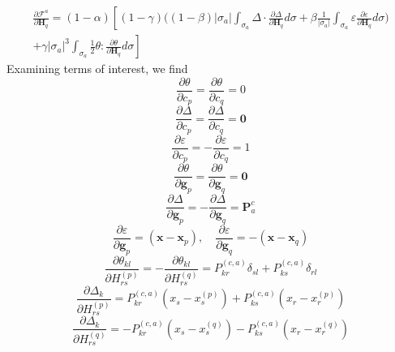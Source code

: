 \documentclass[11pt]{article} %
\begin{document}
\begin{eqnarray}
	\frac{\partial \mathcal{F}^a}{\partial \mathbf{H}_q} = (1-\alpha) \left[ (1-\gamma) \bigg( (1-\beta) | \sigma_a | \int_{\sigma_a} \Delta \cdot \frac{\partial \Delta}{\partial \mathbf{H}_q} d \sigma + \beta \frac{1}{| \sigma_a |} \int_{\sigma_a} \varepsilon \frac{\partial \varepsilon}{\partial \mathbf{H}_q} d \sigma \bigg) \right. \nonumber \\ \left. + \gamma | \sigma_a |^3 \int_{\sigma_a} \frac{1}{2} \theta \colon \frac{\partial \theta}{\partial \mathbf{H}_q} d \sigma \right]
\end{eqnarray}
Examining terms of interest, we find
\begin{equation}
	\frac{\partial \theta}{\partial c_p} = \frac{\partial \theta}{\partial c_q} = 0
\end{equation}
\begin{equation}
	\frac{\partial \Delta}{\partial c_p} = \frac{\partial \Delta}{\partial c_q} = \mathbf{0}
\end{equation}
\begin{equation}
	\frac{\partial \varepsilon}{\partial c_p} = - \frac{\partial \varepsilon}{\partial c_q} = 1
\end{equation}
\begin{equation}
	\frac{\partial \theta}{\partial \mathbf{g}_p} = \frac{\partial \theta}{\partial \mathbf{g}_q} = \mathbf{0}
\end{equation}
\begin{equation}
	\frac{\partial \Delta}{\partial \mathbf{g}_p} = - \frac{\partial \Delta}{\partial \mathbf{g}_q} = \mathbf{P}^c_a
\end{equation}
\begin{equation}
	\frac{\partial \varepsilon}{\partial \mathbf{g}_p} = (\mathbf{x} - \mathbf{x}_p), \quad \frac{\partial \varepsilon}{\partial \mathbf{g}_q} = -(\mathbf{x} - \mathbf{x}_q)
\end{equation}
\begin{equation}
	\frac{\partial \theta_{kl}}{\partial H_{rs}^{(p)}} = - \frac{\partial \theta_{kl}}{\partial H_{rs}^{(q)}} = P^{(c,a)}_{kr} \delta_{sl} + P^{(c,a)}_{ks} \delta_{rl}
\end{equation}
\begin{equation}
	\frac{\partial \Delta_k}{\partial H_{rs}^{(p)}} = P^{(c,a)}_{kr} (x_s - x^{(p)}_s) + P^{(c,a)}_{ks} (x_r - x^{(p)}_r) 
\end{equation}
\begin{equation}
	\frac{\partial \Delta_k}{\partial H_{rs}^{(q)}} = - P^{(c,a)}_{kr} (x_s - x^{(q)}_s) - P^{(c,a)}_{ks} (x_r - x^{(q)}_r) 
\end{equation}
\end{document}
